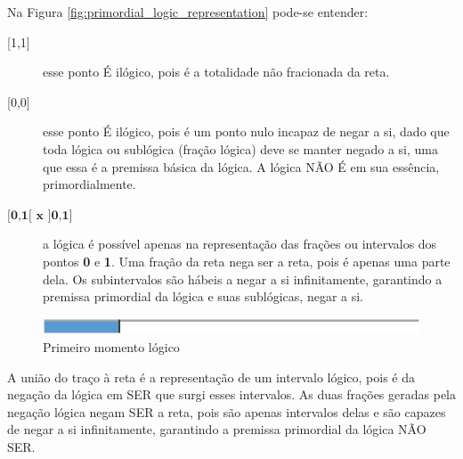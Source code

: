 \bigbreak
Na Figura \ref{fig:primordial_logic_representation} pode-se entender:
\begin{description}
   \item[{[1,1]}] esse ponto É ilógico, pois é a totalidade não fracionada da reta.
   \item[{[0,0]}] esse ponto É ilógico, pois é um ponto nulo incapaz de negar a si, dado que toda lógica ou sublógica (fração lógica) deve se manter negado a si, uma que essa é a premissa básica da lógica. A lógica NÃO É em sua essência, primordialmente.
   \item[$\textbf{{[0,1[ x ]0,1]}}$]a lógica é possível apenas na representação das frações ou intervalos dos pontos \textbf{0} e \textbf{1}. Uma fração da reta nega ser a reta, pois é apenas uma parte dela. Os subintervalos são hábeis a negar a si infinitamente, garantindo a premissa primordial da lógica e suas sublógicas, negar a si. 
\end{description}

\bigbreak
\begin{figure}[hbtp]
\caption{Primeiro momento lógico}
\label{fig:first_logical_moment}
\centering
\includegraphics[scale=1]{sections/images/first_logical_moment.jpg}
\end{figure}

A união do traço à reta é a representação de um intervalo lógico, pois é da negação da lógica em SER que surgi esses intervalos. As duas frações geradas pela negação lógica negam SER a reta, pois são apenas intervalos delas e são capazes de negar a si infinitamente, garantindo a premissa primordial da lógica NÃO SER. 







